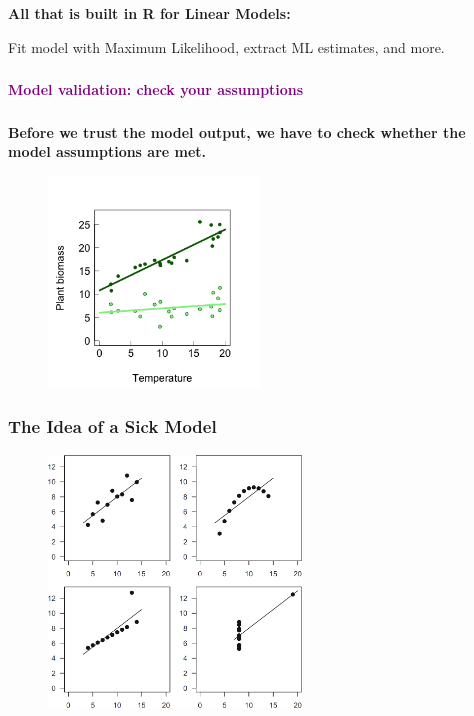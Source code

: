 \documentclass{beamer}
\begin{document}
\begin{frame}
    \frametitle{}
    \textbf{All that is built in R for Linear Models:}
    
    Fit model with Maximum Likelihood, extract ML estimates, and more.
\end{frame}

\begin{frame}
    \frametitle{}
    \begin{center}
        \huge\textbf{\textcolor{purple}{Model validation: check your assumptions}}
    \end{center}
\end{frame}

\begin{frame}
    \frametitle{}
    \textbf{Before we trust the model output, we have to check whether the model assumptions are met.}
    
    \begin{figure}[h]
        \centering
        \includegraphics[width=0.5\textwidth]{lectures/day_3_LM_refresh_II/figures/unnamed-chunk-37-1.png} 
    \end{figure}
\end{frame}

\begin{frame}
    \frametitle{The Idea of a Sick Model}
    \begin{figure}
        \centering
        \includegraphics[width=0.6\textwidth]{lectures/day_2_LM_refresh_I/figures/Anscombe.png}
    \end{figure}
\end{frame}
\end{document}
